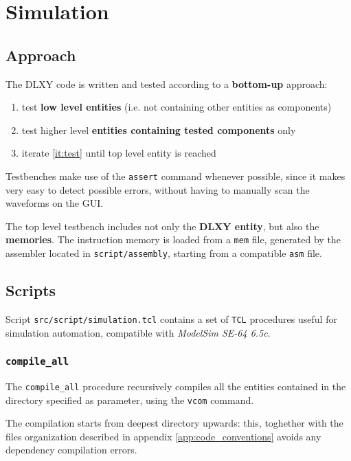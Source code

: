 \chapter{Simulation}
\label{chap:simulation}

\section{Approach}
The DLXY code is written and tested according to a \textbf{bottom-up} approach:
\begin{enumerate}
	\item test \textbf{low level entities} (i.e. not containing other
		entities as components)
	\item \label{it:test} test higher level \textbf{entities containing
		tested components} only
	\item iterate \ref{it:test} until top level entity is reached
\end{enumerate}

Testbenches make use of the \texttt{assert} command whenever possible, since
it makes very easy to detect possible errors, without having to manually scan
the waveforms on the GUI.

\bigskip
The top level testbench includes not only the \textbf{DLXY entity}, but also the
\textbf{memories}. The instruction memory is loaded from a \texttt{mem} file,
generated by the assembler located in \texttt{script/assembly}, starting from
a compatible \texttt{asm} file.

\section{Scripts}
Script \texttt{src/script/simulation.tcl} contains a set of \texttt{TCL}
procedures useful for simulation automation, compatible with
\textit{ModelSim SE-64 6.5c}.
\subsection{\texttt{compile\_all}}
The \texttt{compile\_all} procedure recursively compiles all the entities
contained in the directory specified as parameter, using the \texttt{vcom} command.

The compilation starts from deepest directory upwards: this, toghether with the
files organization described in appendix \ref{app:code_conventions} avoids any
dependency compilation errors.

